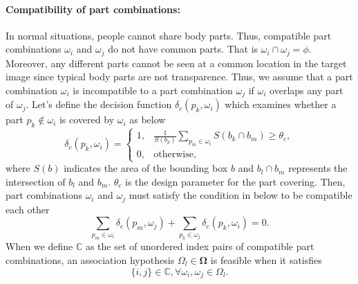\documentclass[10pt,twocolumn,letterpaper]{article}
\begin{document}
\paragraph{Compatibility of part combinations:} 
In normal situations, people cannot share body parts.
Thus, compatible part combinations $\omega_i$ and $\omega_j$ do not have common parts. 
That is $\omega_i \cap \omega_j = \phi$.
Moreover, any different parts cannot be seen at a common location in the target image since typical body parts are not transparence.
Thus, we assume that a part combination $\omega_i$ is incompatible to a part combination $\omega_j$ if $\omega_i$ overlaps any part of $\omega_j$.
Let's define the decision function $\delta_c (p_k, \omega_i)$ which examines whether a part $p_k \notin  \omega_i$ is covered by $\omega_i$ as below
\begin{equation}
   \label{eq:part_occluion}
   \delta_c (p_k, \omega_i) = \begin{cases}
      1, &\frac{1}{S(b_k)} \sum_{p_m \in \omega_i} S(b_k \cap b_m) \geq \theta_{c},\\
      0, &\mathrm{otherwise},
   \end{cases}
\end{equation}
where $S(b)$ indicates the area of the bounding box $b$ and $b_l \cap b_m$ represents the intersection of $b_l$ and $b_m$. $\theta_{c}$ is the design parameter for the part covering. 
Then, part combinations $\omega_i$ and $\omega_j$ must satisfy the condition in below to be compatible each other
\begin{equation}
   \label{eq:compatible_overlap}
   \sum_{p_m \in \omega_i} \delta_c(p_m,\omega_j) + \sum_{p_k \in \omega_j} \delta_c(p_k,\omega_i) = 0.
\end{equation}
When we define $\mathbb{C}$ as the set of unordered index pairs of compatible part combinations, an association hypothesis $\Omega_l \in \mathbf{\Omega}$ is feasible when it satisfies
\begin{equation}
   \label{eq:feasible_association_hypothesis}
   \{i,j\} \in \mathbb{C}, \forall \omega_i,\omega_j \in \Omega_l.
\end{equation}
\end{document}
